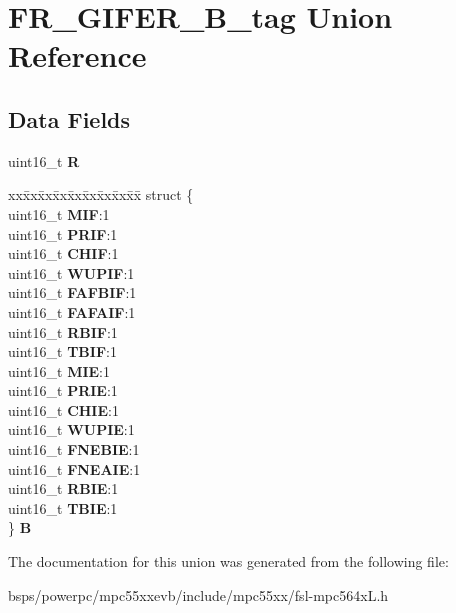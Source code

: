 \hypertarget{unionFR__GIFER__16B__tag}{}\section{F\+R\+\_\+\+G\+I\+F\+E\+R\+\_\+B\+\_\+tag Union Reference}
\label{unionFR__GIFER__16B__tag}
\subsection*{Data Fields}
\begin{DoxyCompactItemize}
\item 
\mbox{\label{unionFR__GIFER__16B__tag_a809265a9d89bdfa50f08159f1f77bcee}} 
uint16\+\_\+t {\bfseries R}
\item 
\mbox{\label{unionFR__GIFER__16B__tag_aeb568a937514e7d4f1ddb0c82ceb691c}} 
\begin{tabbing}
xx\=xx\=xx\=xx\=xx\=xx\=xx\=xx\=xx\=\kill
struct \{\\
\>uint16\_t {\bfseries MIF}:1\\
\>uint16\_t {\bfseries PRIF}:1\\
\>uint16\_t {\bfseries CHIF}:1\\
\>uint16\_t {\bfseries WUPIF}:1\\
\>uint16\_t {\bfseries FAFBIF}:1\\
\>uint16\_t {\bfseries FAFAIF}:1\\
\>uint16\_t {\bfseries RBIF}:1\\
\>uint16\_t {\bfseries TBIF}:1\\
\>uint16\_t {\bfseries MIE}:1\\
\>uint16\_t {\bfseries PRIE}:1\\
\>uint16\_t {\bfseries CHIE}:1\\
\>uint16\_t {\bfseries WUPIE}:1\\
\>uint16\_t {\bfseries FNEBIE}:1\\
\>uint16\_t {\bfseries FNEAIE}:1\\
\>uint16\_t {\bfseries RBIE}:1\\
\>uint16\_t {\bfseries TBIE}:1\\
\} {\bfseries B}\\

\end{tabbing}\end{DoxyCompactItemize}


The documentation for this union was generated from the following file\+:\begin{DoxyCompactItemize}
\item 
bsps/powerpc/mpc55xxevb/include/mpc55xx/fsl-\/mpc564x\+L.\+h\end{DoxyCompactItemize}
